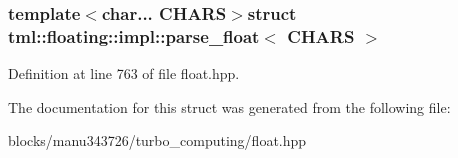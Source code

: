 \subsubsection*{template$<$char... C\+H\+A\+R\+S$>$struct tml\+::floating\+::impl\+::parse\+\_\+float$<$ C\+H\+A\+R\+S $>$}



Definition at line 763 of file float.\+hpp.



The documentation for this struct was generated from the following file\+:\begin{DoxyCompactItemize}
\item 
blocks/manu343726/turbo\+\_\+computing/float.\+hpp\end{DoxyCompactItemize}
